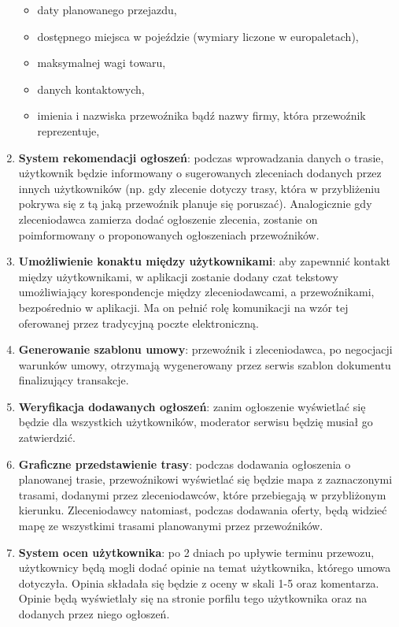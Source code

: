 \begin{enumerate}
\begin{itemize}
        \item daty planowanego przejazdu,
        \item dostępnego miejsca w pojeździe (wymiary liczone w europaletach),
        \item maksymalnej wagi towaru,
        \item danych kontaktowych,
        \item imienia i nazwiska przewoźnika bądź nazwy firmy, która przewoźnik reprezentuje,
    \end{itemize}
    \item \textbf{System rekomendacji ogłoszeń}: podczas wprowadzania danych o trasie, użytkownik będzie informowany o sugerowanych zleceniach dodanych przez innych użytkowników (np. gdy zlecenie dotyczy trasy, która w przybliżeniu pokrywa się z tą jaką przewoźnik planuje się poruszać). Analogicznie gdy zleceniodawca zamierza dodać ogłoszenie zlecenia, zostanie on poimformowany o proponowanych ogłoszeniach przewoźników.
    \item \textbf{Umożliwienie konaktu między użytkownikami}: aby zapewnnić kontakt między użytkownikami, w aplikacji zostanie dodany czat tekstowy umożliwiający korespondencje między zleceniodawcami, a przewoźnikami, bezpośrednio w aplikacji. Ma on pełnić rolę komunikacji na wzór tej  oferowanej przez tradycyjną poczte elektroniczną.
    \item \textbf{Generowanie szablonu umowy}: przewoźnik i zleceniodawca, po negocjacji warunków umowy, otrzymają wygenerowany przez serwis szablon dokumentu finalizujący transakcje.
    \item \textbf{Weryfikacja dodawanych ogłoszeń}: zanim ogłoszenie wyświetlać się będzie dla wszystkich użytkowników, moderator serwisu będzię musiał go zatwierdzić.
    \item \textbf{Graficzne przedstawienie trasy}: podczas dodawania ogłoszenia o planowanej trasie, przewoźnikowi wyświetlać się będzie mapa z zaznaczonymi trasami, dodanymi przez zleceniodawców, które przebiegają w przybliżonym kierunku. Zleceniodawcy natomiast, podczas dodawania oferty, będą widzieć mapę ze wszystkimi trasami planowanymi przez przewoźników.
    \item \textbf{System ocen użytkownika}: po 2 dniach po upływie terminu przewozu, użytkownicy będą mogli dodać opinie na temat użytkownika, którego umowa dotyczyła. Opinia składała się będzie z oceny w skali 1-5 oraz komentarza. Opinie będą wyświetlały się na stronie porfilu tego użytkownika oraz na dodanych przez niego ogłoszeń.
\end{enumerate}

